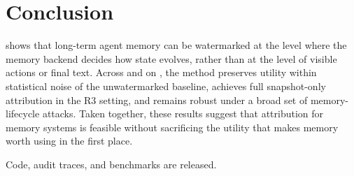 \section{Conclusion}
\label{sec:conclusion}

\memmark{} shows that long-term agent memory can be watermarked at the
level where the memory backend decides how state evolves, rather than
at the level of visible actions or final text. Across \amem{} and
\graphiti{} on \locomo{}, the method preserves utility within
statistical noise of the unwatermarked baseline, achieves full
snapshot-only attribution in the R3 setting, and remains
robust under a broad set of memory-lifecycle attacks. Taken together,
these results suggest that attribution for memory systems is feasible
without sacrificing the utility that makes memory worth using in the
first place.

Code, audit traces, and benchmarks are released.

